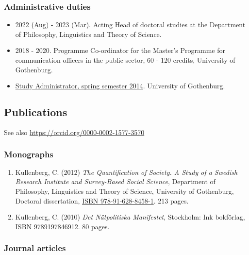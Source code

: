 \documentclass[
]{article}
\providecommand{\tightlist}{%
  \setlength{\itemsep}{0pt}\setlength{\parskip}{0pt}}
\begin{document}
\hypertarget{administrative-duties}{%
\subsubsection{Administrative duties}\label{administrative-duties}}

\begin{itemize}
\tightlist
\item
  2022 (Aug) - 2023 (Mar). Acting Head of doctoral studies at the
  Department of Philosophy, Linguistics and Theory of Science.
\item
  2018 - 2020. Programme Co-ordinator for the Master's Programme for
  communication officers in the public sector, 60 - 120 credits,
  University of Gothenburg.
\item
  \href{http://files.christopherkullenberg.se/studierektoronline.pdf}{Study
  Administrator, spring semester 2014}. University of Gothenburg.
\end{itemize}

\hypertarget{publications}{%
\subsection{Publications}\label{publications}}

See also \url{https://orcid.org/0000-0002-1577-3570}

\hypertarget{monographs}{%
\subsubsection{Monographs}\label{monographs}}

\begin{enumerate}
\def\labelenumi{\arabic{enumi}.}
\tightlist
\item
  Kullenberg, C. (2012) \emph{The Quantification of Society. A Study of
  a Swedish Research Institute and Survey-Based Social Science},
  Department of Philosophy, Linguistics and Theory of Science,
  University of Gothenburg, Doctoral dissertation,
  \href{https://gupea.ub.gu.se/handle/2077/28807}{ISBN
  978-91-628-8458-1}. 213 pages.
\item
  Kullenberg, C. (2010) \emph{Det Nätpolitiska Manifestet}, Stockholm:
  Ink bokförlag, ISBN 9789197846912. 80 pages.
\end{enumerate}

\hypertarget{journal-articles}{%
\subsubsection{Journal articles}\label{journal-articles}}
\end{document}
